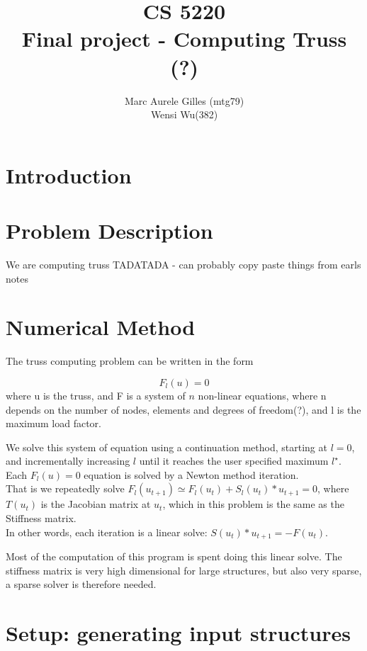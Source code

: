 \documentclass[11pt]{article}
\begin{document}
\title{CS 5220\\ Final project - Computing Truss (?)}
\author{Marc Aurele Gilles (mtg79)\\ Wensi Wu(382) }
\maketitle

\section{Introduction}


\section{Problem Description}

We are computing truss TADATADA - can probably copy paste things from earls notes


\section{Numerical Method}

The truss computing problem can be written in the form

$$F_l(u)=0$$
where u is the truss, and F is a system of $n$ non-linear equations, where n depends on the number of nodes, elements and degrees of freedom(?), and l is the maximum load factor.

We solve this system of equation using a continuation method, starting at $l=0$, and incrementally increasing $l$ until it reaches the user specified maximum $l^{\star}$. Each $F_l(u)=0$ equation is solved by a Newton method iteration.
\\
That is we repeatedly solve $F_l(u_{t+1}) \simeq F_l(u_t) + S_l(u_t)*u_{t+1} =0$, where $T(u_t)$ is the Jacobian matrix at $u_t$, which in this problem is the same as the Stiffness matrix.\\

In other words, each iteration is a linear solve:
$S(u_t)*u_{t+1}=-F(u_t)$.

Most of the computation of this program is spent doing this linear solve. The stiffness matrix is very high dimensional for large structures, but also very sparse, a sparse solver is therefore needed.

\section{Setup: generating input structures}
\end{document}
